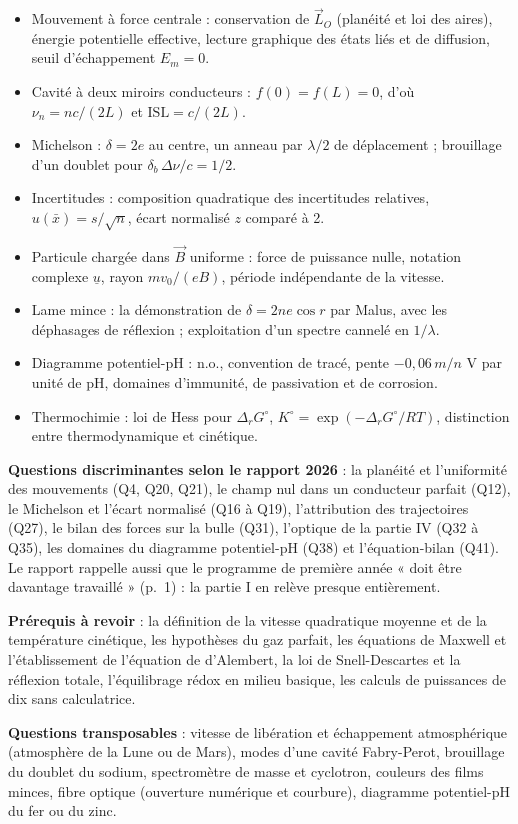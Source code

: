 \documentclass[11pt,a4paper]{article}
\providecommand{\tightlist}{\setlength{\itemsep}{0pt}\setlength{\parskip}{0pt}}
\begin{document}
\begin{itemize}
\tightlist
\item
  Mouvement à force centrale : conservation de \(\vec L_O\) (planéité et loi des aires), énergie potentielle effective, lecture graphique des états liés et de diffusion, seuil d'échappement \(E_m=0\).
\item
  Cavité à deux miroirs conducteurs : \(f(0)=f(L)=0\), d'où \(\nu_n=nc/(2L)\) et \(\mathrm{ISL}=c/(2L)\).
\item
  Michelson : \(\delta=2e\) au centre, un anneau par \(\lambda/2\) de déplacement ; brouillage d'un doublet pour \(\delta_b\,\Delta\nu/c=1/2\).
\item
  Incertitudes : composition quadratique des incertitudes relatives, \(u(\bar x)=s/\sqrt n\), écart normalisé \(z\) comparé à 2.
\item
  Particule chargée dans \(\vec B\) uniforme : force de puissance nulle, notation complexe \(\underline u\), rayon \(mv_0/(eB)\), période indépendante de la vitesse.
\item
  Lame mince : la démonstration de \(\delta=2ne\cos r\) par Malus, avec les déphasages de réflexion ; exploitation d'un spectre cannelé en \(1/\lambda\).
\item
  Diagramme potentiel-pH : n.o., convention de tracé, pente \(-0{,}06\,m/n\) V par unité de pH, domaines d'immunité, de passivation et de corrosion.
\item
  Thermochimie : loi de Hess pour \(\Delta_rG^\circ\), \(K^\circ=\exp(-\Delta_rG^\circ/RT)\), distinction entre thermodynamique et cinétique.
\end{itemize}

\textbf{Questions discriminantes selon le rapport 2026} : la planéité et l'uniformité des mouvements (Q4, Q20, Q21), le champ nul dans un conducteur parfait (Q12), le Michelson et l'écart normalisé (Q16 à Q19), l'attribution des trajectoires (Q27), le bilan des forces sur la bulle (Q31), l'optique de la partie IV (Q32 à Q35), les domaines du diagramme potentiel-pH (Q38) et l'équation-bilan (Q41). Le rapport rappelle aussi que le programme de première année « doit être davantage travaillé » (p.~1) : la partie I en relève presque entièrement.

\textbf{Prérequis à revoir} : la définition de la vitesse quadratique moyenne et de la température cinétique, les hypothèses du gaz parfait, les équations de Maxwell et l'établissement de l'équation de d'Alembert, la loi de Snell-Descartes et la réflexion totale, l'équilibrage rédox en milieu basique, les calculs de puissances de dix sans calculatrice.

\textbf{Questions transposables} : vitesse de libération et échappement atmosphérique (atmosphère de la Lune ou de Mars), modes d'une cavité Fabry-Perot, brouillage du doublet du sodium, spectromètre de masse et cyclotron, couleurs des films minces, fibre optique (ouverture numérique et courbure), diagramme potentiel-pH du fer ou du zinc.
\end{document}
